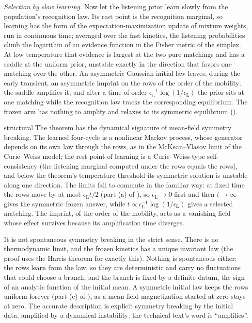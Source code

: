 \emph{Selection by slow learning.} Now let the listening prior learn slowly from the population's
recognition law. Its rest point is the recognition marginal, so learning has the form of the
expectation-maximization update of mixture weights, run in continuous time; averaged over the fast
kinetics, the listening probabilities climb the logarithm of an evidence function in the Fisher metric of
the simplex. At low temperature that evidence is largest at the two pure matchings and has a saddle at
the uniform prior, unstable exactly in the direction that favors one matching over the other. An
asymmetric Gaussian initial law leaves, during the early transient, an asymmetric imprint on the rows of
the order of the mobility; the saddle amplifies it, and after a time of order
$\epsilon_{\mathrm L}^{-1}\log(1/\epsilon_{\mathrm L})$ the prior sits at one matching while the
recognition law tracks the corresponding equilibrium. The frozen arm has nothing to amplify and relaxes
to its symmetric equilibrium ().

\begin{analogy}{structural}
The theorem has the dynamical signature of mean-field symmetry breaking. The learned four-cycle is a
nonlinear Markov process, whose generator depends on its own law through the rows, as in the
McKean--Vlasov limit of the Curie--Weiss model; the rest point of learning is a Curie--Weiss-type
self-consistency (the listening marginal computed under the rows equals the rows), and below the
theorem's temperature threshold its symmetric solution is unstable along one direction. The limits fail
to commute in the familiar way: at fixed time the rows move by at most $\epsilon_{\mathrm L}t/2$ (part (a)
of ), so $\epsilon_{\mathrm L}\to0$ first and then $t\to\infty$
gives the symmetric frozen answer, while $t\propto\epsilon_{\mathrm L}^{-1}\log(1/\epsilon_{\mathrm L})$
gives a selected matching. The imprint, of the order of the mobility, acts as a vanishing field whose
effect survives because its amplification time diverges.

It is not spontaneous symmetry breaking in the strict sense. There is no thermodynamic limit, and the
frozen kinetics has a unique invariant law (the proof uses the Harris theorem for exactly this). Nothing
is spontaneous either: the rows learn from the law, so they are deterministic and carry no fluctuations
that could choose a branch, and the branch is fixed by a definite datum, the sign of an analytic function
of the initial mean. A symmetric initial law keeps the rows uniform forever (part (c) of
), as a mean-field magnetization started at zero stays at zero.
The accurate description is explicit symmetry breaking by the initial data, amplified by a dynamical
instability; the technical text's word is ``amplifies''.
\end{analogy}


